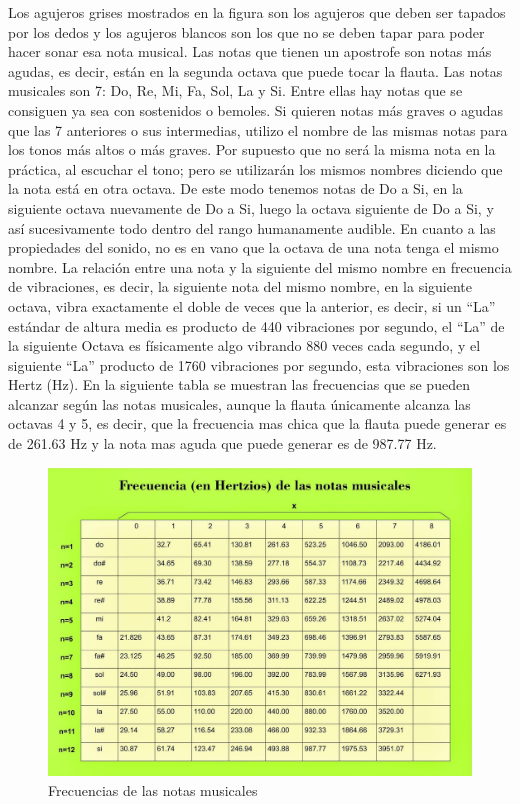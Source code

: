 Los agujeros grises mostrados en la figura son los agujeros que deben
ser tapados por los dedos y los agujeros blancos son los que no se
deben tapar para poder hacer sonar esa nota musical. Las notas que
tienen un apostrofe son notas más agudas, es decir, están en la segunda
octava que puede tocar la flauta. Las notas musicales son 7: Do, Re,
Mi, Fa, Sol, La y Si. Entre ellas hay notas que se consiguen ya sea
con sostenidos o bemoles. Si quieren notas más graves o agudas que
las 7 anteriores o sus intermedias, utilizo el nombre de las mismas
notas para los tonos más altos o más graves. Por supuesto que no será
la misma nota en la práctica, al escuchar el tono; pero se utilizarán
los mismos nombres diciendo que la nota está en otra octava. De este
modo tenemos notas de Do a Si, en la siguiente octava nuevamente de
Do a Si, luego la octava siguiente de Do a Si, y así sucesivamente
todo dentro del rango humanamente audible. En cuanto a las propiedades
del sonido, no es en vano que la octava de una nota tenga el mismo
nombre. La relación entre una nota y la siguiente del mismo nombre
en frecuencia de vibraciones, es decir, la siguiente nota del mismo
nombre, en la siguiente octava, vibra exactamente el doble de veces
que la anterior, es decir, si un \textquotedblleft La\textquotedblright{}
estándar de altura media es producto de 440 vibraciones por segundo,
el \textquotedblleft La\textquotedblright{} de la siguiente Octava
es físicamente algo vibrando 880 veces cada segundo, y el siguiente
\textquotedblleft La\textquotedblright{} producto de 1760 vibraciones
por segundo, esta vibraciones son los Hertz (Hz). En la siguiente
tabla se muestran las frecuencias que se pueden alcanzar según las
notas musicales, aunque la flauta únicamente alcanza las octavas 4
y 5, es decir, que la frecuencia mas chica que la flauta puede generar
es de 261.63 Hz y la nota mas aguda que puede generar es de 987.77
Hz. 
\begin{figure}[H]
	\begin{center}
		\includegraphics[scale=.24]{img/frecuencias.jpg}
		\caption{Frecuencias de las notas musicales}
		\label{fig:tabla1}
	\end{center}
\end{figure}


